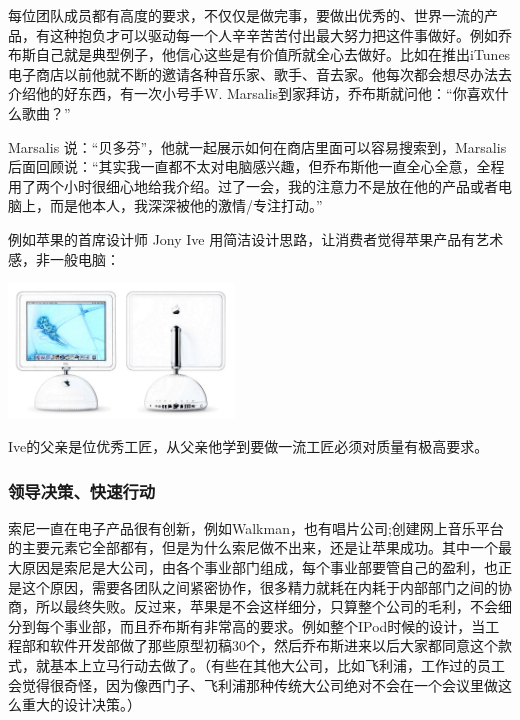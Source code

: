 每位团队成员都有高度的要求，不仅仅是做完事，要做出优秀的、世界一流的产品，有这种抱负才可以驱动每一个人辛辛苦苦付出最大努力把这件事做好。例如乔布斯自己就是典型例子，他信心这些是有价值所就全心去做好。比如在推出iTunes电子商店以前他就不断的邀请各种音乐家、歌手、音去家。他每次都会想尽办法去介绍他的好东西，有一次小号手W. Marsalis到家拜访，乔布斯就问他：“你喜欢什么歌曲？”

Marsalis
说：``贝多芬''，他就一起展示如何在商店里面可以容易搜索到，Marsalis后面回顾说：``其实我一直都不太对电脑感兴趣，但乔布斯他一直全心全意，全程用了两个小时很细心地给我介绍。过了一会，我的注意力不是放在他的产品或者电脑上，而是他本人，我深深被他的激情/专注打动。''

例如苹果的首席设计师 Jony Ive
用简洁设计思路，让消费者觉得苹果产品有艺术感，非一般电脑：




\includegraphics[width=6cm]{R-C_副本.jpg}

Ive的父亲是位优秀工匠，从父亲他学到要做一流工匠必须对质量有极高要求。

\hypertarget{ux9886ux5bfcux51b3ux7b56ux5febux901fux884cux52a8}{%
\subsubsection{领导决策、快速行动}\label{ux9886ux5bfcux51b3ux7b56ux5febux901fux884cux52a8}}

索尼一直在电子产品很有创新，例如Walkman，也有唱片公司;创建网上音乐平台的主要元素它全部都有，但是为什么索尼做不出来，还是让苹果成功。其中一个最大原因是索尼是大公司，由各个事业部门组成，每个事业部要管自己的盈利，也正是这个原因，需要各团队之间紧密协作，很多精力就耗在内耗于内部部门之间的协商，所以最终失败。反过来，苹果是不会这样细分，只算整个公司的毛利，不会细分到每个事业部，而且乔布斯有非常高的要求。例如整个IPod时候的设计，当工程部和软件开发部做了那些原型初稿30个，然后乔布斯进来以后大家都同意这个款式，就基本上立马行动去做了。（有些在其他大公司，比如飞利浦，工作过的员工会觉得很奇怪，因为像西门子、飞利浦那种传统大公司绝对不会在一个会议里做这么重大的设计决策。）


